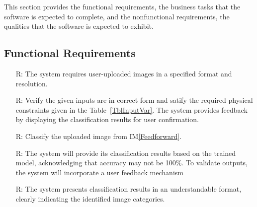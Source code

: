 \documentclass[12pt]{article}
\newcommand{\iref}[1]{IM\ref{#1}}
\newcounter{reqnum} %
\begin{document}

This section provides the functional requirements, the business tasks that the
software is expected to complete, and the nonfunctional requirements, the
qualities that the software is expected to exhibit.

\subsection{Functional Requirements}

\noindent \begin{itemize}

\item[R\refstepcounter{reqnum}\thereqnum \label{R_Inputs}:] 
The system requires user-uploaded images in a specified format and resolution. 

\item[R\refstepcounter{reqnum}\thereqnum \label{R_OutputInputs}:] 
Verify the given inputs are in correct form and satify the required physical constraints
given in the Table~\ref{TblInputVar}. 
The system provides feedback by displaying the classification results for user confirmation.

\item[R\refstepcounter{reqnum}\thereqnum \label{R_Calculate}:] 
Classify the uploaded image from \iref{Feedforward}.

\item[R\refstepcounter{reqnum}\thereqnum \label{R_VerifyOutput}:] 
The system will provide its classification results based on the trained model, 
acknowledging that accuracy may not be 100\%. 
To validate outputs, the system will incorporate a user feedback mechanism

\item[R\refstepcounter{reqnum}\thereqnum \label{R_Output}:] 
The system presents classification results in an understandable format, clearly indicating the 
identified image categories.
\end{itemize}

\end{document}
